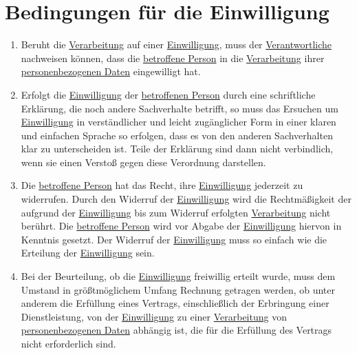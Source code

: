 \chapter{Bedingungen für die Einwilligung}
\label{ch:7}


\begin{enumerate}

  \item Beruht die \hyperref[itm:04-2]{Verarbeitung} auf einer \hyperref[itm:04-11]{Einwilligung}, muss der \hyperref[itm:04-7]{Verantwortliche} nachweisen können, dass die \hyperref[itm:04-1]{betroffene
   Person} in die \hyperref[itm:04-2]{Verarbeitung} ihrer \hyperref[itm:04-1]{personenbezogenen Daten} eingewilligt hat.
  \label{itm:07-1}

  \item Erfolgt die \hyperref[itm:04-11]{Einwilligung} der \hyperref[itm:04-1]{betroffenen Person} durch eine schriftliche Erklärung, die noch andere Sachverhalte
   betrifft, so muss das Ersuchen um \hyperref[itm:04-11]{Einwilligung} in verständlicher und leicht zugänglicher Form in einer klaren und
   einfachen Sprache so erfolgen, dass es von den anderen Sachverhalten klar zu unterscheiden ist. Teile der Erklärung
   sind dann nicht verbindlich, wenn sie einen Verstoß gegen diese Verordnung darstellen.
  \label{itm:07-2}

  \item Die \hyperref[itm:04-1]{betroffene Person} hat das Recht, ihre \hyperref[itm:04-11]{Einwilligung} jederzeit zu widerrufen. Durch den Widerruf der
   \hyperref[itm:04-11]{Einwilligung} wird die Rechtmäßigkeit der aufgrund der \hyperref[itm:04-11]{Einwilligung} bis zum Widerruf erfolgten \hyperref[itm:04-2]{Verarbeitung} nicht
   berührt. Die \hyperref[itm:04-1]{betroffene Person} wird vor Abgabe der \hyperref[itm:04-11]{Einwilligung} hiervon in Kenntnis gesetzt. Der Widerruf der
   \hyperref[itm:04-11]{Einwilligung} muss so einfach wie die Erteilung der \hyperref[itm:04-11]{Einwilligung} sein.
  \label{itm:07-3}

  \item Bei der Beurteilung, ob die \hyperref[itm:04-11]{Einwilligung} freiwillig erteilt wurde, muss dem Umstand in größtmöglichem Umfang
   Rechnung getragen werden, ob unter anderem die Erfüllung eines Vertrags, einschließlich der Erbringung einer
   Dienstleistung, von der \hyperref[itm:04-11]{Einwilligung} zu einer \hyperref[itm:04-2]{Verarbeitung} von \hyperref[itm:04-1]{personenbezogenen Daten} abhängig ist, die für die
   Erfüllung des Vertrags nicht erforderlich sind.
  \label{itm:07-4}

\end{enumerate}


